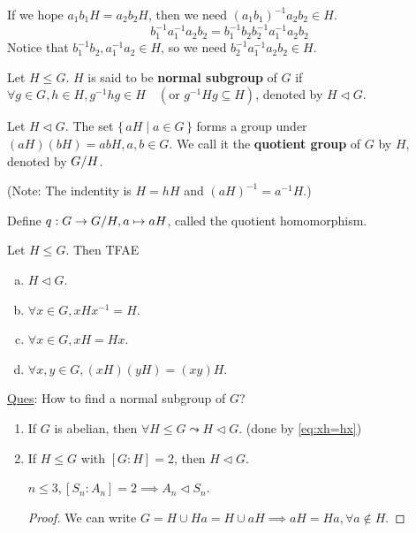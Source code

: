 If we hope $a_1b_1H = a_2b_2H$, then we need $(a_1b_1)^{-1}a_2b_2 \in H$.
\[
  b_1^{-1}a_1^{-1}a_2b_2 = b_1^{-1}b_2b_2^{-1}a_1^{-1}a_2b_2
\]
Notice that $b_1^{-1}b_2, a_1^{-1}a_2 \in H$, so we need
$b_2^{-1}a_1^{-1}a_2b_2 \in H$.

\begin{definition}
  Let $H \le G$. $H$ is said to be {\bf normal subgroup} of $G$ if
  $\forall g \in G, h \in H, g^{-1}hg \in H \quad
  (\text{or~} g^{-1}Hg \subseteq H)$, denoted by $H \lhd G$.
\end{definition}

\begin{definition}
  Let $H \lhd G$. The set $\{\, aH \mid a \in G \,\}$ forms a group under
  $(aH)(bH) = abH, a,b \in G$. We call it the {\bf quotient group}
  of $G$ by $H$, denoted by ${G}/{H}$.

  (Note: The indentity is $H = hH$ and $(aH)^{-1} = a^{-1}H$.)
\end{definition}

\begin{remark}
  Define $q: G \to {G}/{H}, a \mapsto aH$, called the quotient homomorphism.
\end{remark}

\begin{exercise}
  Let $H \le G$. Then TFAE
  \begin{enumerate}[(a)]
    \item $H \lhd G$.
    \item $\forall x \in G, xHx^{-1} = H$.
    \item $\forall x \in G, xH = Hx$. \label{eq:xh=hx}
    \item $\forall x, y \in G, (xH)(yH) = (xy)H$.
  \end{enumerate}
\end{exercise}

\underline{Ques}: How to find a normal subgroup of $G$?

\begin{prop} \mbox{}
  \begin{enumerate}
    \item If $G$ is abelian, then $\forall H \le G \leadsto H \lhd G$.
      (done by \ref{eq:xh=hx})
    \item If $H \le G$ with $[G:H] = 2$, then $H \lhd G$.
      \begin{example}
        $n \le 3, [S_n:A_n] = 2 \implies A_n \lhd S_n$.
      \end{example}
      \begin{proof}
        We can write $G = H \cup Ha = H \cup aH \implies aH = Ha,
        \forall a \notin H$.
      \end{proof}
  \end{enumerate}
\end{prop}

